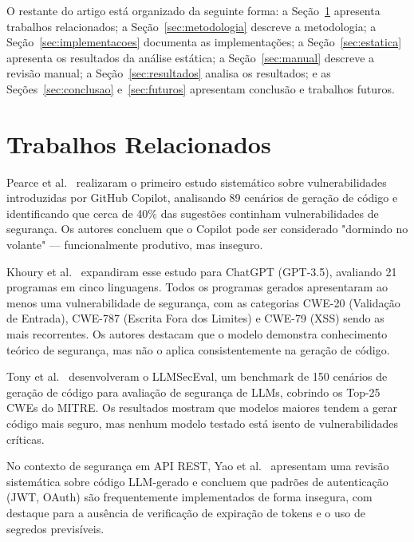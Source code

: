 \documentclass[12pt]{article}
\begin{document}
O restante do artigo está organizado da seguinte forma: a Seção~\ref{sec:trabalhos} apresenta trabalhos relacionados; a Seção~\ref{sec:metodologia} descreve a metodologia; a Seção~\ref{sec:implementacoes} documenta as implementações; a Seção~\ref{sec:estatica} apresenta os resultados da análise estática; a Seção~\ref{sec:manual} descreve a revisão manual; a Seção~\ref{sec:resultados} analisa os resultados; e as Seções~\ref{sec:conclusao} e~\ref{sec:futuros} apresentam conclusão e trabalhos futuros.

\section{Trabalhos Relacionados}
\label{sec:trabalhos}

Pearce et al.~\cite{pearce2022asleep} realizaram o primeiro estudo sistemático sobre vulnerabilidades introduzidas por GitHub Copilot, analisando 89 cenários de geração de código e identificando que cerca de 40\% das sugestões continham vulnerabilidades de segurança. Os autores concluem que o Copilot pode ser considerado "dormindo no volante" — funcionalmente produtivo, mas inseguro.

Khoury et al.~\cite{khoury2023secure} expandiram esse estudo para ChatGPT (GPT-3.5), avaliando 21 programas em cinco linguagens. Todos os programas gerados apresentaram ao menos uma vulnerabilidade de segurança, com as categorias CWE-20 (Validação de Entrada), CWE-787 (Escrita Fora dos Limites) e CWE-79 (XSS) sendo as mais recorrentes. Os autores destacam que o modelo demonstra conhecimento teórico de segurança, mas não o aplica consistentemente na geração de código.

Tony et al.~\cite{tony2023llmseceval} desenvolveram o LLMSecEval, um benchmark de 150 cenários de geração de código para avaliação de segurança de LLMs, cobrindo os Top-25 CWEs do MITRE. Os resultados mostram que modelos maiores tendem a gerar código mais seguro, mas nenhum modelo testado está isento de vulnerabilidades críticas.

No contexto de segurança em API REST, Yao et al.~\cite{yao2024survey} apresentam uma revisão sistemática sobre código LLM-gerado e concluem que padrões de autenticação (JWT, OAuth) são frequentemente implementados de forma insegura, com destaque para a ausência de verificação de expiração de tokens e o uso de segredos previsíveis.
\end{document}
